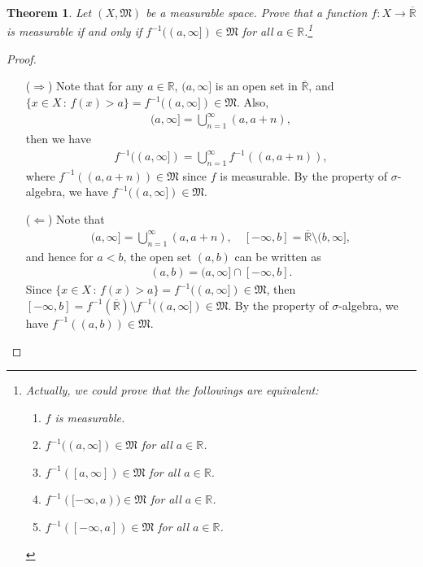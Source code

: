 \documentclass[11pt]{book}
\newtheorem{theorem}{Theorem}[chapter]
\theoremstyle{definition}
\numberwithin{equation}{chapter}
\begin{document}
\begin{theorem}\label{theprem_24}
Let $(X,\mathfrak{M})$ be a measurable space. Prove that a function $f: X \to \overline{\mathbb{R}}$ is measurable if and only if $f^{-1}((a,\infty]) \in \mathfrak{M}$ for all $a \in \mathbb{R}$.\footnote{Actually, we could prove that the followings are equivalent\cite{9}:
\begin{enumerate}[label=(\alph*)]
    \item $f$ is measurable.
    
    \item $f^{-1}((a,\infty]) \in \mathfrak{M}$ for all $a \in \mathbb{R}$.
    
    \item $f^{-1}([a,\infty]) \in \mathfrak{M}$ for all $a \in \mathbb{R}$.
    
    \item $f^{-1}([-\infty,a)) \in \mathfrak{M}$ for all $a \in \mathbb{R}$.
    
    \item $f^{-1}([-\infty,a]) \in \mathfrak{M}$ for all $a \in \mathbb{R}$.
\end{enumerate}}
\end{theorem}
\begin{proof}
~\begin{enumerate}
    \item[($\Rightarrow$)] Note that for any $a \in \mathbb{R}$, $(a,\infty]$ is an open set in $\overline{\mathbb{R}}$, and $\{x \in X\,:\, f(x) > a\} = f^{-1}((a,\infty]) \in \mathfrak{M}$. Also,
    \begin{align*}
        (a,\infty] = \bigcup^\infty_{n=1} (a, a + n),
    \end{align*}
    then we have
    \begin{align*}
        f^{-1}((a,\infty]) = \bigcup^\infty_{n=1} f^{-1}((a,a + n)),
    \end{align*}
    where $f^{-1}((a,a + n)) \in \mathfrak{M}$ since $f$ is measurable. By the property of $\sigma$-algebra, we have $f^{-1}((a,\infty]) \in \mathfrak{M}$.
    
    \item[($\Leftarrow$)] Note that
    \begin{align*}
        (a,\infty] = \bigcup^\infty_{n=1} (a, a + n), \quad [-\infty,b] = \overline{\mathbb{R}} \setminus (b,\infty],
    \end{align*}
    and hence for $a < b$, the open set $(a,b)$ can be written as
    \begin{align*}
        (a,b) = (a,\infty] \cap [-\infty,b].
    \end{align*}
    Since $\{x \in X\,:\, f(x) > a\} = f^{-1}((a,\infty]) \in \mathfrak{M}$, then $[-\infty,b] = f^{-1}(\overline{\mathbb{R}}) \setminus f^{-1}((a,\infty]) \in \mathfrak{M}$. By the property of $\sigma$-algebra, we have $f^{-1}((a,b)) \in \mathfrak{M}$.
\end{enumerate}
\end{proof}
\end{document}
